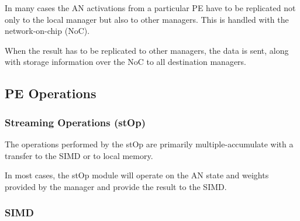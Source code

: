 \documentclass[journal]{IEEEtran}
\begin{document}

In many cases the AN activations from a particular PE have to be replicated not only to the local manager but also to other managers. This is handled with the network-on-chip (NoC).
\iffalse
The result storage directives are communicated by using the same storage descriptor mechanism. When the result has to be replicated to other managers, the storage descriptors are sent, along with the data to all destination managers.
\else
When the result has to be replicated to other managers, the data is sent, along with storage information over the NoC to all destination managers.
\fi

\subsection{PE Operations}
\label{sec:PE Operations}

\subsubsection{Streaming Operations (stOp)}
\label{ssec:streamingOps}
The operations performed by the stOp are primarily multiple-accumulate with a transfer to the SIMD or to local memory.

In most cases, the stOp module will operate on the AN state and weights provided by the manager and provide the result to the SIMD.
\subsubsection{SIMD}
\label{ssec:SIMD}
\end{document}
